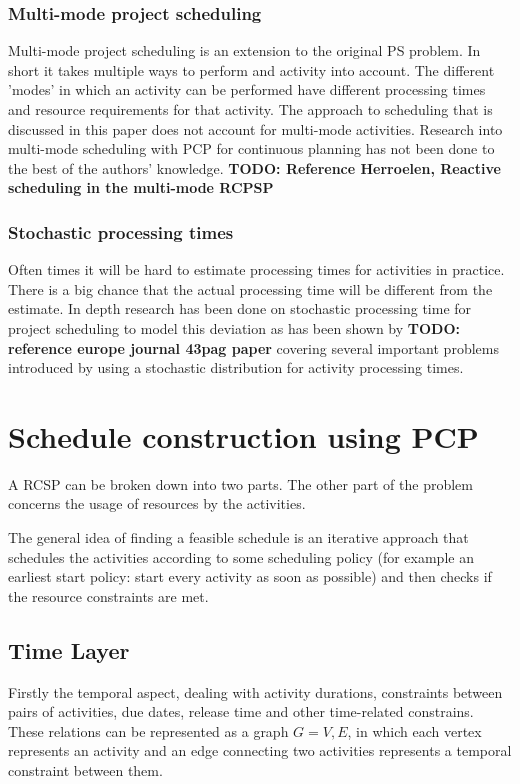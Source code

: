 \documentclass{article}
\newcommand{\TODO}[1]{{\color{red}\textbf{TODO: #1}}}
\begin{document}
\subsubsection{Multi-mode project scheduling}
Multi-mode project scheduling is an extension to the original PS problem. In short it takes multiple ways to perform and activity into account. The different 'modes' in which an activity can be performed have different processing times and resource requirements for that activity. The approach to scheduling that is discussed in this paper does not account for multi-mode activities. Research into multi-mode scheduling with PCP for continuous planning has not been done to the best of the authors' knowledge. 
\TODO{Reference Herroelen, Reactive scheduling in the multi-mode RCPSP}

\subsubsection{Stochastic processing times}
Often times it will be hard to estimate processing times for activities in practice. There is a big chance that the actual processing time will be  different from the estimate. In depth research has been done on stochastic processing time for project scheduling to model this deviation as has been shown by \TODO{reference europe journal 43pag paper} covering several important problems introduced by using a stochastic distribution for activity processing times. 

\section{Schedule construction using PCP}
A RCSP can be broken down into two parts.  The other part of the problem concerns the usage of resources by the activities. 

The general idea of finding a feasible schedule is an iterative approach that schedules the activities according to some scheduling policy (for example an earliest start policy: start every activity as soon as possible) and then checks if the resource constraints are met. 

\subsection{Time Layer}
Firstly the temporal aspect, dealing with activity durations, constraints between pairs of activities, due dates, release time and other time-related constrains. These relations can be represented as a graph $G={V,E}$, in which each vertex represents an activity and an edge connecting two activities represents a temporal constraint between them.
\end{document}

